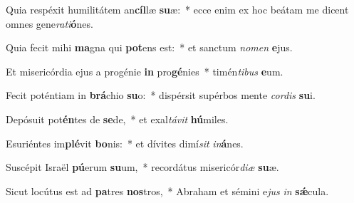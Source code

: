 \item Quia respéxit humilitátem an\textbf{cíl}læ \textbf{su}æ:~* ecce enim ex hoc beátam me dicent omnes gene\textit{ra}\textit{ti}\textbf{ó}nes.
\item Quia fecit mihi \textbf{ma}gna qui \textbf{pot}ens est:~* et sanctum \textit{no}\textit{men} \textbf{e}jus.
\item Et misericórdia ejus a progénie \textbf{in} pro\textbf{gé}nies~* timén\textit{ti}\textit{bus} \textbf{e}um.
\item Fecit poténtiam in \textbf{brá}chio \textbf{su}o:~* dispérsit supérbos mente \textit{cor}\textit{dis} \textbf{su}i.
\item Depósuit pot\textbf{én}tes de \textbf{se}de,~* et exal\textit{tá}\textit{vit} \textbf{hú}miles.
\item Esuriéntes im\textbf{plé}vit \textbf{bo}nis:~* et dívites dimí\textit{sit} \textit{in}\textbf{á}nes.
\item Suscépit Israël \textbf{pú}erum \textbf{su}um,~* recordátus misericór\textit{di}\textit{æ} \textbf{su}æ.
\item Sicut locútus est ad \textbf{pa}tres \textbf{nos}tros,~* Abraham et sémini e\textit{jus} \textit{in} \textbf{sǽ}cula.
